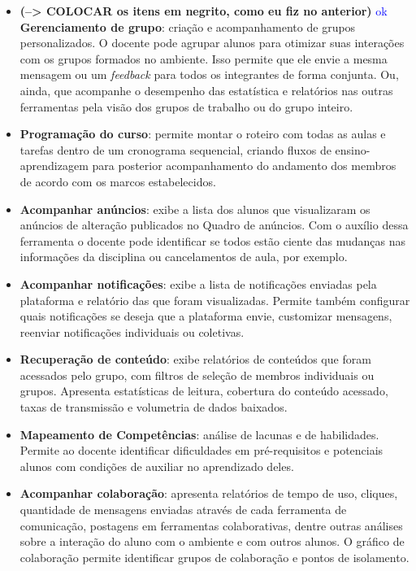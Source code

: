 \begin{itemize}

\item \textbf{(--> COLOCAR os itens em negrito, como eu fiz no anterior)} \textcolor{blue} {ok} \textbf{Gerenciamento de grupo}: criação e acompanhamento de grupos personalizados. O docente pode agrupar alunos para otimizar suas interações com os grupos formados no ambiente. Isso permite que ele envie a mesma mensagem ou um \textit{feedback} para todos os integrantes de forma conjunta. Ou, ainda, que acompanhe o desempenho das estatística e relatórios nas outras ferramentas pela visão dos grupos de trabalho ou do grupo inteiro. 

\item \textbf{Programação do curso}: permite montar o roteiro com todas as aulas e tarefas dentro de um cronograma sequencial, criando fluxos de ensino-aprendizagem para posterior acompanhamento do andamento dos membros de acordo com os marcos estabelecidos.

\item \textbf{Acompanhar anúncios}: exibe a lista dos alunos que visualizaram os anúncios de alteração publicados no Quadro de anúncios. Com o auxílio dessa ferramenta o docente pode identificar se todos estão ciente das mudanças nas informações da disciplina ou cancelamentos de aula, por exemplo. 

\item \textbf{Acompanhar notificações}: exibe a lista de notificações enviadas pela plataforma e relatório das que foram visualizadas. Permite também configurar quais notificações se deseja que a plataforma envie, customizar mensagens, reenviar notificações individuais ou coletivas.

\item \textbf{Recuperação de conteúdo}: exibe relatórios de conteúdos que foram acessados pelo grupo, com filtros de seleção de membros individuais ou grupos. Apresenta estatísticas de leitura, cobertura do conteúdo acessado, taxas de transmissão e volumetria de dados baixados. 

\item \textbf{Mapeamento de Competências}: análise de lacunas e de habilidades. Permite ao docente identificar dificuldades em pré-requisitos e potenciais alunos com condições de auxiliar no aprendizado deles.

\item \textbf{Acompanhar colaboração}: apresenta relatórios de tempo de uso, cliques, quantidade de mensagens enviadas através de cada ferramenta de comunicação, postagens em ferramentas colaborativas, dentre outras análises sobre a interação do aluno com o ambiente e com outros alunos. O gráfico de colaboração permite identificar grupos de colaboração e pontos de isolamento.


\end{itemize}

